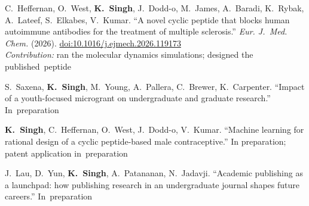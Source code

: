 \begin{enumerate}[label={[\arabic*]},leftmargin=2.2em,itemsep=3pt,topsep=1pt,start=1]
  \item C.~Heffernan, O.~West, \textbf{K.~Singh}, J.~Dodd-o, M.~James, A.~Baradi, K.~Rybak, A.~Lateef, S.~Elkabes, V.~Kumar. ``A novel cyclic peptide that blocks human autoimmune antibodies for the treatment of multiple sclerosis.'' \textit{Eur. J.~Med. Chem.} (2026). \cvkeep{}\cvlast{}\href{https://doi.org/10.1016/j.ejmech.2026.119173}{doi:10.1016/j.ejmech.2026.119173}\cvkeepend{}\\
  \textit{Contribution:} ran the molecular dynamics simulations; designed the \cvkeep{}published~\cvlast{}peptide\cvkeepend{}
  \item S.~Saxena, \textbf{K.~Singh}, M.~Young, A.~Pallera, C.~Brewer, K.~Carpenter. ``Impact of a youth-focused microgrant on undergraduate and graduate research.'' \cvkeep{}In~\cvlast{}preparation\cvkeepend{}
  \item \textbf{K.~Singh}, C.~Heffernan, O.~West, J.~Dodd-o, V.~Kumar. ``Machine learning for rational design of a cyclic peptide-based male contraceptive.'' In preparation; patent application \cvkeep{}in~\cvlast{}preparation\cvkeepend{}
  \item J.~Lau, D.~Yun, \textbf{K.~Singh}, A.~Patananan, N.~Jadavji. ``Academic publishing as a launchpad: how publishing research in an undergraduate journal shapes future careers.'' \cvkeep{}In~\cvlast{}preparation\cvkeepend{}
\end{enumerate}

